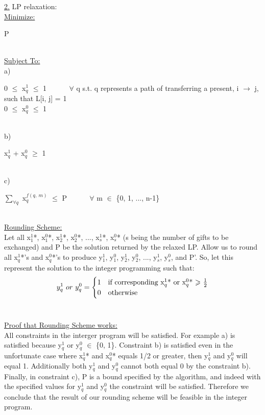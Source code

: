 \documentclass[10pt]{csc_assignment}
\begin{document}
\begin{description}
\underline{2.} LP relaxation:\\
\underline{Minimize:}\\
\hspace*{1cm}\parbox{15cm}{
P
}\\
\underline{Subject To:}\\
a) \\
\hspace*{1cm}\parbox{15cm}{
0 $\leqslant$ x$_{q}^1$ $\leqslant$ 1 ~~~~~ $\forall$ q s.t. q represents a path of transferring a present, i $\rightarrow$ j, such that L[i, j] = 1\\
0 $\leqslant$ x$_{q}^0$ $\leqslant$ 1 
}\\
b)\\
\hspace*{1cm}\parbox{15cm}{
x$_{q}^1$ + x$_{q}^0$ $\geqslant$ 1\\
}\\
c)\\
\hspace*{1cm}\parbox{15cm}{
$\sum_{\forall q}$ x$_{q}^{f(q,~ m)}$ $\leqslant$ P ~~~~~ $\forall$ m $\in$ \{0, 1, ..., n-1\}\\
}\\
\underline{Rounding Scheme:}\\
Let all x$_{1}^1$*, x$_{1}^0$*, x$_{2}^1$*, x$_{2}^0$*, ..., x$_{s}^1$*, x$_{s}^0$* (s being the number of gifts to be exchanged) and P be the solution returned by the relaxed LP. Allow us to round all x$_{q}^1$*'s and x$_{q}^0$*'s to produce y$_{1}^1$, y$_{1}^0$, y$_{2}^1$, y$_{2}^0$, ..., y$_{s}^1$, y$_{s}^0$, and P'. So, let this represent the solution to the integer programming such that:\\
\[
y_{q}^1 ~or~ y_{q}^0 = 
\begin{cases} 
      \hfill 1 \hfill & \text{if corresponding x$_{q}^1$* or x$_{q}^0$* $\geqslant$ $\frac{1}{2}$} \\
      \hfill 0 \hfill & \text{otherwise} \\
  \end{cases}
\]
 \\
\begin{flushleft}
\underline{Proof that Rounding Scheme works:}\\
All constraints in the interger program will be satisfied. For example a) is satisfied because y$_{q}^1$ or y$_{q}^0$ $\in$ \{0, 1\}. Constraint b) is satisfied even in the unfortunate case where x$_{q}^1$* and x$_{q}^0$* equals 1/2 or greater, then y$_{q}^1$ and y$_{q}^0$ will equal 1. Additionally both y$_{q}^1$ and y$_{q}^0$ cannot both equal 0 by the constraint b). Finally, in constraint c), P is a bound specified by the algorithm, and indeed with the specified values for y$_{q}^1$ and y$_{q}^0$ the constraint will be satisfied. Therefore we conclude that the result of our rounding scheme will be feasible in the integer program.\\

\end{flushleft}
\end{description}
\end{document}
